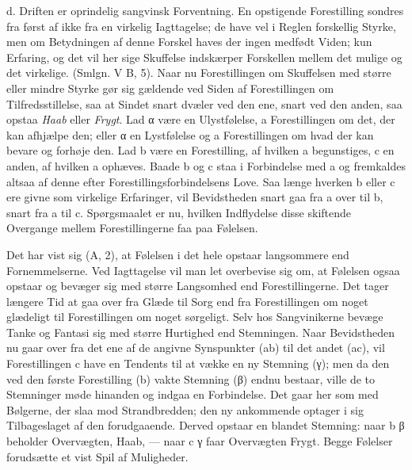 \documentclass[12pt,a4paper,openany]{book}
\newcommand{\opage}[1]{\marginnote{\footnotesize\textit{[#1]}}}
\begin{document}
d. Driften er oprindelig sangvinsk Forventning. En opstigende
Forestilling sondres fra først af ikke fra en virkelig Iagttagelse; de
have vel i Reglen forskellig Styrke, men om Betydningen af denne Forskel
haves der ingen medfødt Viden; kun Erfaring, og det vil her sige
Skuffelse indskærper Forskellen mellem det mulige og det virkelige.
(Smlgn. V B, 5). Naar nu Forestillingen om Skuffelsen med større eller
mindre Styrke gør sig gældende ved Siden af Forestillingen om
Tilfredsstillelse, saa at Sindet snart dvæler ved den ene, snart ved den
anden, saa opstaa \emph{Haab} eller \emph{Frygt}. Lad α være en
Ulystfølelse, a Forestillingen om det, der kan afhjælpe den; eller α en
Lystfølelse og a Forestillingen om hvad der kan
\opage{285}bevare og forhøje den. Lad b være en Forestilling, af hvilken
a begunstiges, c en anden, af hvilken a ophæves. Baade b og c staa i
Forbindelse med a og fremkaldes altsaa af denne efter
Forestillingsforbindelsens Love. Saa længe hverken b eller c ere givne
som virkelige Erfaringer, vil Bevidstheden snart gaa fra a over til b,
snart fra a til c. Spørgsmaalet er nu, hvilken Indflydelse disse
skiftende Overgange mellem Forestillingerne faa paa Følelsen.

Det har vist sig (A, 2), at Følelsen i det hele opstaar langsommere end
Fornemmelserne. Ved Iagttagelse vil man let overbevise sig om, at
Følelsen ogsaa opstaar og bevæger sig med større Langsomhed end
Forestillingerne. Det tager længere Tid at gaa over fra Glæde til Sorg
end fra Forestillingen om noget glædeligt til Forestillingen om noget
sørgeligt. Selv hos Sangvinikerne bevæge Tanke og Fantasi sig med større
Hurtighed end Stemningen. Naar Bevidstheden nu gaar over fra det ene af
de angivne Synspunkter (ab) til det andet (ac), vil Forestillingen c
have en Tendents til at vække en ny Stemning (γ); men da den ved den
første Forestilling (b) vakte Stemning (β) endnu bestaar, ville de to
Stemninger møde hinanden og indgaa en Forbindelse. Det gaar her som med
Bølgerne, der slaa mod Strandbredden; den ny ankommende optager i sig
Tilbageslaget af den forudgaaende. Derved opstaar en blandet Stemning:
naar b β beholder Overvægten, Haab, --- naar c γ faar Overvægten Frygt.
Begge Følelser forudsætte et vist Spil af Muligheder.
\end{document}
